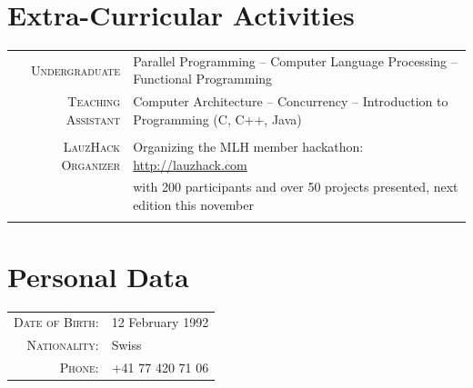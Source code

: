 \documentclass[a4paper,11pt]{article} %
\begin{document}
\section{Extra-Curricular Activities}
\begin{tabular}{rl}
\textsc{\large{Undergraduate}} &
Parallel Programming --
Computer Language Processing -- Functional Programming \\
\textsc{\large{Teaching Assistant}} &
Computer Architecture -- Concurrency -- Introduction to Programming (C, C++, Java) \\
\multicolumn{2}{c}{} \\

\textsc{\large{LauzHack Organizer}} &
Organizing the MLH member hackathon: \href{http://lauzhack.com}{http://lauzhack.com} \\
& with 200 participants and over 50 projects presented, next edition this november\\
\multicolumn{2}{c}{} \\

\end{tabular}


\section{Personal Data}
\begin{center}
\begin{tabular}{rl}
\textsc{Date of Birth:} & 12 February 1992 \\
\textsc{Nationality:} & Swiss \\
\textsc{Phone:} & +41 77 420 71 06\\
\end{tabular}
\end{center}
\end{document}
